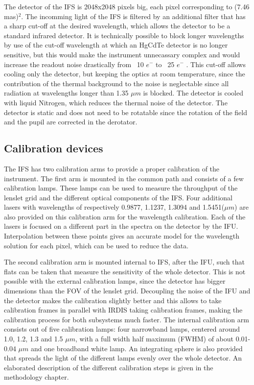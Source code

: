 \documentclass[twoside,single]{lion-msc}
\begin{document}
The detector of the IFS is 2048x2048 pixels big, each pixel corresponding to (7.46 mas)$^2$. The incomming light of the IFS is filtered by an additional filter that has a sharp cut-off at the desired wavelength, which allows the detector to be a standard infrared detector. It is technically possible to block longer wavelengths by use of the cut-off wavelength at which an HgCdTe detector is no longer sensitive, but this would make the instrument unnecassary complex and would increase the readout noise drastically from ~10 $e^-$ to ~25 $e^-$ \citep{Claudi2006}. This cut-off allows cooling only the detector, but keeping the optics at room temperature, since the contribution of the thermal background to the noise is neglectable since all radiation at wavelengths longer than 1.35 $\mu m$ is blocked. The detector is cooled with liquid Nitrogen, which reduces the thermal noise of the detector\citep{Claudi2006}. The detector is static and does not need to be rotatable since the rotation of the field and the pupil are corrected in the derotator. 

\subsection{Calibration devices}
The IFS has two calibration arms to provide a proper calibration of the instrument. The first arm is mounted in the common path and consists of a few calibration lamps. These lamps can be used to measure the throughput of the lenslet grid and the different optical components of the IFS. Four additional lasers with wavelengths of respectively 0.9877, 1.1237, 1.3094 and 1.5451($\mu m$) are also provided on this calibration arm for the wavelength calibration. Each of the lasers is focused on a different part in the spectra on the detector by the IFU. Interpolation between these points gives an accurate model for the wavelength solution for each pixel, which can be used to reduce the data.
\bigskip

The second calibration arm is mounted internal to IFS, after the IFU, such that flats can be taken that measure the sensitivity of the whole detector. This is not possible with the external calibration lamps, since the detector has bigger dimensions than the FOV of the lenslet grid. Decoupling the noise of the IFU and the detector makes the calibration slightly better and this allows to take calibration frames in parallel with IRDIS taking calibration frames, making the calibration process for both subsystems much faster. The internal calibration arm consists out of five calibration lamps: four narrowband lamps, centered around 1.0, 1.2, 1.3 and 1.5 $\mu m$, with a full width half maximum (FWHM) of about 0.01-0.04 $\mu m$ and one broadband white lamp\citep{Desidera2008}. An integrating sphere is also provided that spreads the light of the different lamps evenly over the whole detector. An elaborated description of the different calibration steps is given in the methodology chapter.
\end{document}
